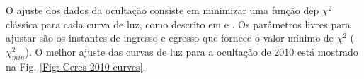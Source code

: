 \documentclass[12pt,a4paper]{monografia}
\begin{document}
O ajuste dos dados da ocultação consiste em minimizar uma função dep $\chi^{2}$ clássica para cada curva de luz, como descrito em \cite{Sicardy2011} e \cite{Braga-Ribas2013}. Os parâmetros livres para ajustar são os instantes de ingresso e egresso que fornece o valor mínimo de $\chi^{2}$ ($\chi^{2}_{min}$). O melhor ajuste das curvas de luz para a ocultação de 2010 está mostrado na Fig. \ref{Fig: Ceres-2010-curves}.

\begin{figure}[h]
\begin{centering}

\end{centering}
\end{figure}
\end{document}
